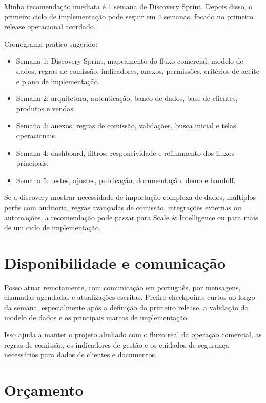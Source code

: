 \documentclass[11pt,a4paper]{article}
\begin{document}
Minha recomendação imediata é 1 semana de Discovery Sprint. Depois disso, o primeiro ciclo de implementação pode seguir em 4 semanas, focado no primeiro release operacional acordado.\par

Cronograma prático sugerido:\par

\begin{itemize}
\item Semana 1: Discovery Sprint, mapeamento do fluxo comercial, modelo de dados, regras de comissão, indicadores, anexos, permissões, critérios de aceite e plano de implementação.
\item Semana 2: arquitetura, autenticação, banco de dados, base de clientes, produtos e vendas.
\item Semana 3: anexos, regras de comissão, validações, busca inicial e telas operacionais.
\item Semana 4: dashboard, filtros, responsividade e refinamento dos fluxos principais.
\item Semana 5: testes, ajustes, publicação, documentação, demo e handoff.
\end{itemize}

Se a discovery mostrar necessidade de importação complexa de dados, múltiplos perfis com auditoria, regras avançadas de comissão, integrações externas ou automações, a recomendação pode passar para Scale \& Intelligence ou para mais de um ciclo de implementação.\par

\section*{Disponibilidade e comunicação}

Posso atuar remotamente, com comunicação em português, por mensagens, chamadas agendadas e atualizações escritas. Prefiro checkpoints curtos ao longo da semana, especialmente após a definição do primeiro release, a validação do modelo de dados e os principais marcos de implementação.\par

Isso ajuda a manter o projeto alinhado com o fluxo real da operação comercial, as regras de comissão, os indicadores de gestão e os cuidados de segurança necessários para dados de clientes e documentos.\par

\section*{Orçamento}
\end{document}
